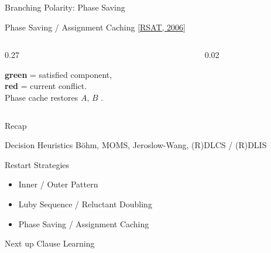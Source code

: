 \documentclass[t]{sdqbeamer}
\begin{document}
\begin{frame}{Branching Polarity: Phase Saving}
\begin{blueblock}{Phase Saving / Assignment Caching \hfill \href{http://reasoning.cs.ucla.edu/rsat/}{[RSAT, 2006]}}
\begin{columns}[T]
\begin{column}{0.27\textwidth}
\begin{flushleft}
\textcolor{green!55!black}{\textbf{green}} = satisfied component,\\ \textcolor{red!75!black}{\textbf{red}} = current conflict.\\[0.3ex]
Phase cache restores $A$, $B$ .
\end{flushleft}
\end{column}
		\begin{column}{0.02\textwidth}\end{column}
\end{columns}
\vspace{0.3em}
\end{blueblock}
\end{frame}

\begin{frame}{Recap}
	\begin{block}{Decision Heuristics}
		B\"ohm, MOMS, Jeroslow-Wang, (R)DLCS / (R)DLIS
	\end{block}
	\begin{block}{Restart Strategies}
		\begin{itemize}\setlength{\itemsep}{1ex}
			\item Inner / Outer Pattern
			\item Luby Sequence / Reluctant Doubling
			\item Phase Saving / Assignment Caching
		\end{itemize}
	\end{block}
	\begin{block}{Next up}
		Clause Learning
	\end{block}
\end{frame}
\end{document}

